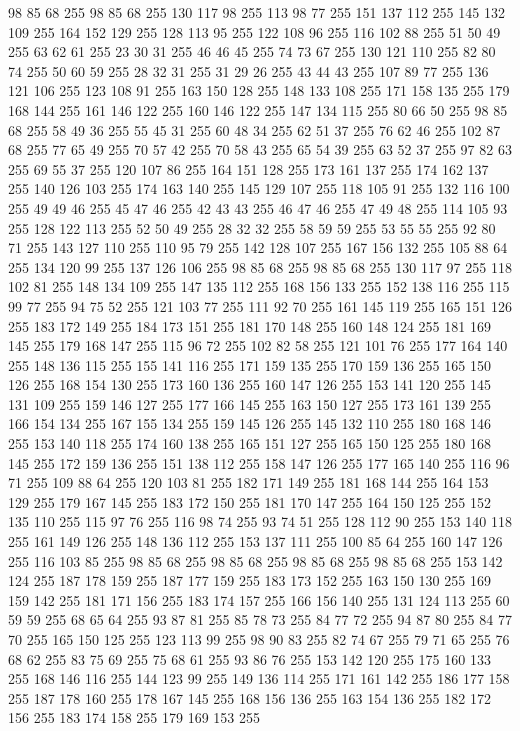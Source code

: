 98 85 68 255 98 85 68 255 130 117 98 255 113 98 77 255 151 137 112 255 145 132 109 255 164 152 129 255 128 113 95 255 122 108 96 255 116 102 88 255 51 50 49 255 63 62 61 255 23 30 31 255 46 46 45 255 74 73 67 255 130 121 110 255 82 80 74 255 50 60 59 255 28 32 31 255 31 29 26 255 43 44 43 255 107 89 77 255 136 121 106 255 123 108 91 255 163 150 128 255 148 133 108 255 171 158 135 255 179 168 144 255 161 146 122 255 160 146 122 255 147 134 115 255 80 66 50 255 98 85 68 255 58 49 36 255 55 45 31 255 60 48 34 255 62 51 37 255 76 62 46 255 102 87 68 255 77 65 49 255 70 57 42 255 70 58 43 255 65 54 39 255 63 52 37 255 97 82 63 255 69 55 37 255 120 107 86 255 164 151 128 255 173 161 137 255 174 162 137 255 140 126 103 255 174 163 140 255 145 129 107 255 118 105 91 255 132 116 100 255 49 49 46 255 45 47 46 255 42 43 43 255 46 47 46 255 47 49 48 255 114 105 93 255 128 122 113 255 52 50 49 255 28 32 32 255
58 59 59 255 53 55 55 255 92 80 71 255 143 127 110 255 110 95 79 255 142 128 107 255 167 156 132 255 105 88 64 255 134 120 99 255 137 126 106 255 98 85 68 255 98 85 68 255 130 117 97 255 118 102 81 255 148 134 109 255 147 135 112 255 168 156 133 255 152 138 116 255 115 99 77 255 94 75 52 255 121 103 77 255 111 92 70 255 161 145 119 255 165 151 126 255 183 172 149 255 184 173 151 255 181 170 148 255 160 148 124 255 181 169 145 255 179 168 147 255 115 96 72 255 102 82 58 255 121 101 76 255 177 164 140 255 148 136 115 255 155 141 116 255 171 159 135 255 170 159 136 255 165 150 126 255 168 154 130 255 173 160 136 255 160 147 126 255 153 141 120 255 145 131 109 255 159 146 127 255 177 166 145 255 163 150 127 255 173 161 139 255 166 154 134 255 167 155 134 255 159 145 126 255 145 132 110 255 180 168 146 255 153 140 118 255 174 160 138 255 165 151 127 255 165 150 125 255 180 168 145 255 172 159 136 255 151 138 112 255 158 147 126 255 177 165 140 255 116 96 71 255 109 88 64 255
120 103 81 255 182 171 149 255 181 168 144 255 164 153 129 255 179 167 145 255 183 172 150 255 181 170 147 255 164 150 125 255 152 135 110 255 115 97 76 255 116 98 74 255 93 74 51 255 128 112 90 255 153 140 118 255 161 149 126 255 148 136 112 255 153 137 111 255 100 85 64 255 160 147 126 255 116 103 85 255 98 85 68 255 98 85 68 255 98 85 68 255 98 85 68 255 153 142 124 255 187 178 159 255 187 177 159 255 183 173 152 255 163 150 130 255 169 159 142 255 181 171 156 255 183 174 157 255 166 156 140 255 131 124 113 255 60 59 59 255 68 65 64 255 93 87 81 255 85 78 73 255 84 77 72 255 94 87 80 255 84 77 70 255 165 150 125 255 123 113 99 255 98 90 83 255 82 74 67 255 79 71 65 255 76 68 62 255 83 75 69 255 75 68 61 255 93 86 76 255 153 142 120 255 175 160 133 255 168 146 116 255 144 123 99 255 149 136 114 255 171 161 142 255 186 177 158 255 187 178 160 255 178 167 145 255 168 156 136 255 163 154 136 255 182 172 156 255 183 174 158 255 179 169 153 255
